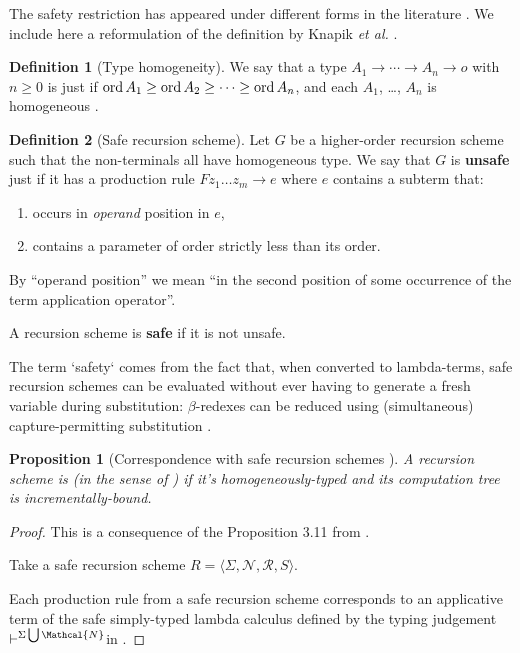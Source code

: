 \documentclass[a4paper,draft]{article}[12pt]
\newtheorem{proposition}{Proposition}[section]
\theoremstyle{remark}
\theoremstyle{definition}
\newtheorem{definition}{Definition}[section]
\begin{document}
The safety restriction has appeared under different forms in the literature \cite{KNU02,Dam82,demirandathesis,BlumPhd,blumong:safelambdacalculus}.
We include here a reformulation of the definition by Knapik {\it et al.} \cite{KNU02}.

\begin{definition}[Type homogeneity]
\label{subsec:typehomogeneity}
We say that a type $A_1 \longrightarrow \cdots \longrightarrow A_n \longrightarrow o$ with $n \geq 0$ is 
just if $\mathop{\mathrm{ord}}{A_1} \geq \mathop{\mathrm{ord}}{A_2}\geq \cdots \geq \mathop{\mathrm{ord}}{A_n}$, and each $A_1$, \ldots, $A_n$ is homogeneous \cite{KNU02}.
\end{definition}

\begin{definition}[Safe recursion scheme]
Let $G$ be a higher-order recursion scheme such that the non-terminals all have homogeneous type.
We say that $G$ is \textbf{unsafe} just if it has a production rule $F z_1 \ldots z_m \rightarrow e$ where $e$ contains a subterm that:
\begin{enumerate}
	\item occurs in {\em operand} position in $e$,
	\item contains a parameter of order strictly less than its order.
\end{enumerate}
By ``operand position'' we mean ``in the second position of some
occurrence of the term application operator''.

A recursion scheme is \textbf{safe} if it is not unsafe.
\end{definition}

The term `safety` comes from the fact that, when converted to lambda-terms, safe recursion schemes can be evaluated without ever having to generate a fresh variable during substitution: $\beta$-redexes can be reduced using (simultaneous) capture-permitting substitution \cite{BlumPhd,blumong:safelambdacalculus,safety-mirlong2004}.

\begin{proposition}[Correspondence with safe recursion schemes \cite{BlumPhd}]
	A recursion scheme is  (in the sense of \cite{KNU02}) if it's homogeneously-typed and its computation tree is incrementally-bound.
\end{proposition}
\begin{proof}

 This is a consequence of the Proposition 3.11 from \cite{BlumPhd}.

Take a safe recursion scheme $R = \langle
\Sigma, \mathcal{N}, \mathcal{R}, S \rangle$.
 
Each production rule from a safe recursion scheme corresponds to an applicative term of the safe simply-typed lambda calculus defined by the typing judgement $\vdash^{\Sigma\Union\Mathcal{N}}$in \cite{BlumPhd}.

\end{proof}
\end{document}
